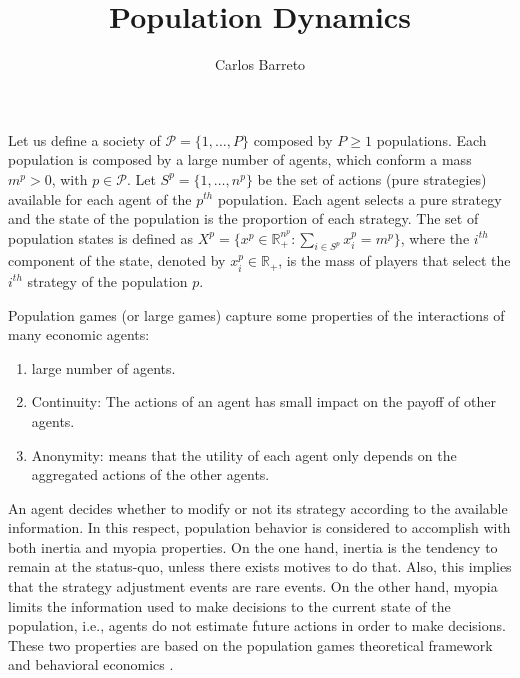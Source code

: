 \documentclass[a4paper,10pt]{article}
\title{Population Dynamics}
\author{Carlos Barreto}
\def\th{^{th}}
\newcommand{\pop}{\mathcal{P}}
\begin{document}
\maketitle



Let us define a society of $\pop = \{ 1, \ldots, P\}$ composed by $P \geq 1$ populations. Each population is composed by a large number of agents, which conform a mass $m^p > 0$, with $p \in \pop$. 
Let $S^p = \{ 1, \ldots, n^p \}$ be the set of actions (pure strategies) available for each agent of the $p\th$ population. 
Each agent selects a pure strategy and the state of the population is the proportion of each strategy. The set of population states is defined as $X^p = \{ x^p \in \mathbb{R}_+^{n^p} : \sum_{i \in S^p} x_i^p = m^p \}$, where the $i\th$ component of the state, denoted by $x_i^p \in \mathbb{R}_+$, is the mass of players that select the $i\th$ strategy of the population $p$.

Population games (or large games) capture some properties of the interactions of many economic agents:

\begin{enumerate}
\item large number of agents.
\item Continuity: The actions of an agent has small impact on the payoff of other agents.
\item Anonymity: means that the utility of each agent only depends on the aggregated actions of the other agents.
\end{enumerate}



An agent decides whether to modify or not its strategy according to the available information. In this respect,  population behavior is considered to accomplish with both inertia and myopia properties. On the one hand, inertia 
is the tendency to remain at the status-quo, unless there exists motives to do that.
Also, this implies that the strategy adjustment events are rare events.
On the other hand, myopia limits the information used to make decisions to the current state of the population, i.e., agents do not estimate future actions in
order to make decisions. These two properties are based on the population games theoretical framework \cite{sandholm_book}
and behavioral economics \cite{gal}.
\end{document}
